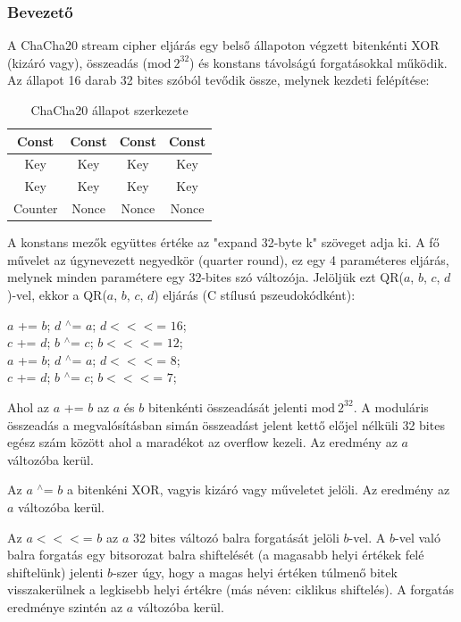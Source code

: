 \documentclass[12pt]{article}
\begin{document}
	\subsubsection*{Bevezető}
	A ChaCha20 stream cipher eljárás egy belső állapoton végzett bitenkénti XOR (kizáró vagy), összeadás ($ \textrm{mod} \ 2^{32}$) és konstans távolságú forgatásokkal működik. Az állapot 16 darab 32 bites szóból tevődik össze, melynek kezdeti felépítése:
	
	\begin{table}[h]
	\centering
		\begin{tabular}{|c|c|c|c|}
			\hline
			\rowcolor{yellow}Const&Const&Const&Const\\\hline
			\rowcolor[rgb]{0.04313,0.7137,1} Key&Key&Key&Key\\\hline
			\rowcolor[rgb]{0.04313,0.7137,1} Key&Key&Key&Key\\\hline
			\cellcolor[rgb]{1,0.3686,0.3686}Counter& \cellcolor[rgb]{0,1, 0.26}Nonce&\cellcolor[rgb]{0,1, 0.26}Nonce&\cellcolor[rgb]{0,1, 0.26}Nonce\\\hline
		\end{tabular}
	\caption{ChaCha20 állapot szerkezete}
	\end{table}
	A konstans mezők együttes értéke az "expand 32-byte k" szöveget adja ki. A fő művelet az úgynevezett negyedkör (quarter round), ez egy 4 paraméteres eljárás, melynek minden paramétere egy 32-bites szó változója. Jelöljük ezt QR($a$, $b$, $c$, $d$)-vel, ekkor a QR($a$, $b$, $c$, $d$) eljárás (C stílusú pszeudokódként):
	\begin{center}
	$a$ += $b$; $d$ $^\wedge$= $a$; $d <<<$= $16$; \\
	$c$ += $d$; $b$ $^\wedge$= $c$; $b <<<$= $12$; \\
	$a$ += $b$; $d$ $^\wedge$= $a$; $d <<<$= $8$; \\
	$c$ += $d$; $b$ $^\wedge$= $c$; $b <<<$= $7$;
	\end{center}
	Ahol az $a$ += $b$ az $a$ és $b$ bitenkénti összeadását jelenti $\textrm{mod}\ 2^{32}$. A moduláris összeadás a megvalósításban simán összeadást jelent kettő előjel nélküli 32 bites egész szám között ahol a maradékot az overflow kezeli. Az eredmény az $a$ változóba kerül.
	
	Az $a$ $^\wedge$= $b$ a bitenkéni XOR, vagyis kizáró vagy műveletet jelöli. Az eredmény az $a$ változóba kerül.
	
	Az $a <<<$= $b$ az $a$ 32 bites változó balra forgatását jelöli $b$-vel. A $b$-vel való balra forgatás egy bitsorozat balra shiftelését (a magasabb helyi értékek felé shiftelünk) jelenti $b$-szer úgy, hogy a magas helyi értéken túlmenő bitek visszakerülnek a legkisebb helyi értékre (más néven: ciklikus shiftelés). A forgatás eredménye szintén az $a$ változóba kerül.
\end{document}

